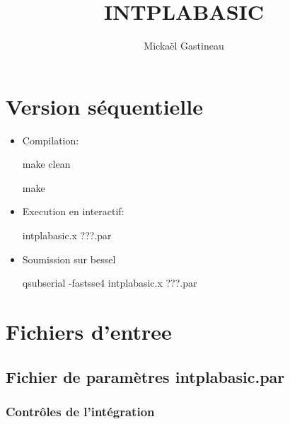\documentclass[11pt]{article}
\title{INTPLABASIC}
\author{Micka\"el Gastineau}
\begin{document}
\maketitle

\section{Version s\'equentielle}

\begin{itemize}
 \item Compilation:  
 
make clean

make
 
\item Execution en interactif: 

intplabasic.x  ???.par
\item Soumission sur bessel

qsubserial -fastsse4 intplabasic.x  ???.par
\end{itemize}


\section{Fichiers d'entree}

\subsection{Fichier de param\`etres  intplabasic.par}

\subsubsection*{Contr\^oles de l'int\'egration}
\end{document}
